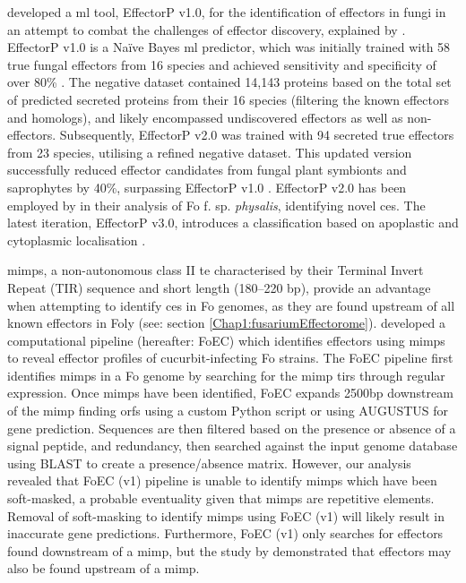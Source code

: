 \textcite{Sperschneider2016} developed a \ac{ml} tool, EffectorP v1.0, for the identification of effectors in fungi in an attempt to combat the challenges of effector discovery, explained by \textcite{Sperschneider2015, LoPresti2015}. EffectorP v1.0 is a Naïve Bayes \ac{ml} predictor, which was initially trained with 58 true fungal effectors from 16 species and achieved sensitivity and specificity of over 80\% \parencite{Sperschneider2016}. The negative dataset contained 14,143 proteins based on the total set of predicted secreted proteins from their 16 species (filtering the known effectors and homologs), and likely encompassed undiscovered effectors as well as non-effectors. Subsequently, EffectorP v2.0 was trained with 94 secreted true effectors from 23 species, utilising a refined negative dataset. This updated version successfully reduced effector candidates from fungal plant symbionts and saprophytes by 40\%, surpassing EffectorP v1.0 \parencite{Sperschneider2018}. EffectorP v2.0 has been employed by \textcite{Simbaqueba2020} in their analysis of \ac{Fo} f. sp. \textit{physalis}, identifying novel \acp{ce}. The latest iteration, EffectorP v3.0, introduces a classification based on apoplastic and cytoplasmic localisation \parencite{Sperschneider2022}. 

\Acfp{mimp}, a non-autonomous class II \acl{te} characterised by their Terminal Invert Repeat (TIR) sequence and short length (180–220 bp), provide an advantage when attempting to identify \acp{ce} in \ac{Fo} genomes, as they are found upstream of all known effectors in \ac{Foly} \parencite{Schmidt2013} (see: section \ref{Chap1:fusariumEffectorome}). \textcite{Dam2016} developed a computational pipeline (hereafter: FoEC) which identifies effectors using \acp{mimp} to reveal effector profiles of cucurbit-infecting \ac{Fo} strains. The FoEC pipeline first identifies \acp{mimp} in a \ac{Fo} genome by searching for the \ac{mimp} \acp{tir} through regular expression. Once \acp{mimp} have been identified, FoEC expands 2500bp downstream of the \ac{mimp} finding \acp{orf} using a custom Python script or using AUGUSTUS \parencite{Stanke2006} for gene prediction. Sequences are then filtered based on the presence or absence of a signal peptide, and redundancy, then searched against the input genome database using BLAST to create a presence/absence matrix. However, our analysis revealed that FoEC (v1) pipeline is unable to identify \acp{mimp} which have been soft-masked, a probable eventuality given that \acp{mimp} are repetitive elements. Removal of soft-masking to identify \acp{mimp} using FoEC (v1) will likely result in inaccurate gene predictions. Furthermore, FoEC (v1) only searches for effectors found downstream of a \ac{mimp}, but the study by \textcite{Schmidt2013} demonstrated that effectors may also be found upstream of a \ac{mimp}. 

